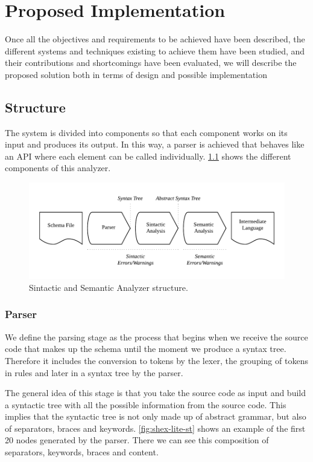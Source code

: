\chapter{Proposed Implementation}
\label{ch:proposed-implementation}

Once all the objectives and requirements to be achieved have been described,
the different systems and techniques existing to achieve them have been studied,
and their contributions and shortcomings have been evaluated, we will describe
the proposed solution both in terms of design and possible implementation

\section{Structure}
The system is divided into components so that each component works on its input
and produces its output. In this way, a parser is achieved that behaves like
an API where each element can be called individually. \cref{fig:shex-lite-sema}
shows the different components of this analyzer.

\begin{figure}
    \includegraphics[width=\textwidth]{images/sin-sem-structure.pdf}
    \centering
    \caption[Sintactic and Semantic Analyzer structure]{Sintactic and Semantic Analyzer structure.}
    \label{fig:shex-lite-sema}
\end{figure}

\subsection{Parser}
We define the parsing stage as the process that begins when we receive the source code that makes up
the schema until the moment we produce a syntax tree. Therefore it includes the conversion to tokens
by the lexer, the grouping of tokens in rules and later in a syntax tree by the parser.

The general idea of this stage is that you take the source code as input and build a syntactic tree with all
the possible information from the source code. This implies that the syntactic tree is not only made up of
abstract grammar, but also of separators, braces and keywords. \cref{fig:shex-lite-st} shows an example
of the first 20 nodes generated by the parser. There we can see this composition of separators, keywords, braces
and content.

